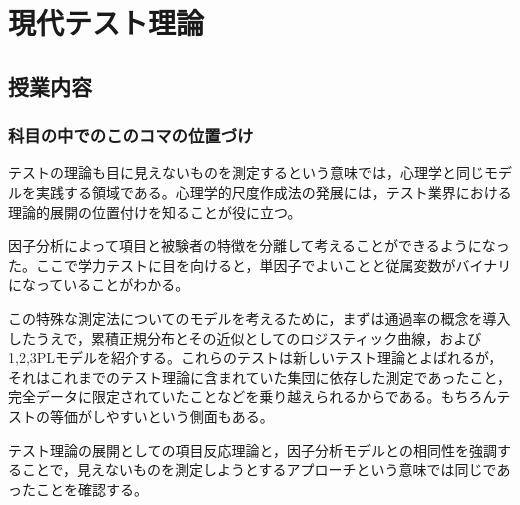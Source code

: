 \section{現代テスト理論}
\subsection{授業内容}
\subsubsection{科目の中でのこのコマの位置づけ}
テストの理論も目に見えないものを測定するという意味では，心理学と同じモデルを実践する領域である。心理学的尺度作成法の発展には，テスト業界における理論的展開の位置付けを知ることが役に立つ。

因子分析によって項目と被験者の特徴を分離して考えることができるようになった。ここで学力テストに目を向けると，単因子でよいことと従属変数がバイナリになっていることがわかる。

この特殊な測定法についてのモデルを考えるために，まずは通過率の概念を導入したうえで，累積正規分布とその近似としてのロジスティック曲線，および1,2,3PLモデルを紹介する。これらのテストは新しいテスト理論とよばれるが，それはこれまでのテスト理論に含まれていた集団に依存した測定であったこと，完全データに限定されていたことなどを乗り越えられるからである。もちろんテストの等価がしやすいという側面もある。

テスト理論の展開としての項目反応理論と，因子分析モデルとの相同性を強調することで，見えないものを測定しようとするアプローチという意味では同じであったことを確認する。

